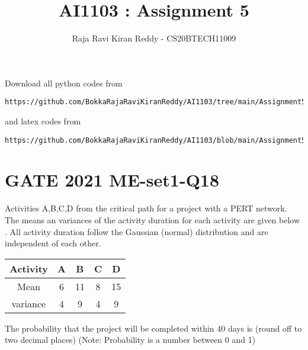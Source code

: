 \documentclass[journal,12pt,twocolumn]{IEEEtran}
\begin{document}
\let\vec\mathbf
\renewcommand{\thefigure}{\theproblem}
\def\putbox#1#2#3{\makebox[0in][l]{\makebox[#1][l]{}\raisebox{\baselineskip}[0in][0in]{\raisebox{#2}[0in][0in]{#3}}}}
     \def\rightbox#1{\makebox[0in][r]{#1}}
     \def\centbox#1{\makebox[0in]{#1}}
     \def\topbox#1{\raisebox{-\baselineskip}[0in][0in]{#1}}
     \def\midbox#1{\raisebox{-0.5\baselineskip}[0in][0in]{#1}}
\vspace{3cm}
\title{AI1103 : Assignment 5}
\author{Raja Ravi Kiran Reddy - CS20BTECH11009}
\maketitle
\newpage
\bigskip
\renewcommand{\thefigure}{\arabic{figure}}
\renewcommand{\thetable}{\arabic{table}}
Download all python codes from 
\begin{lstlisting}
https://github.com/BokkaRajaRaviKiranReddy/AI1103/tree/main/Assignment5/codes
\end{lstlisting}
%
and latex codes from 
%
\begin{lstlisting}
https://github.com/BokkaRajaRaviKiranReddy/AI1103/blob/main/Assignment5/Assignment5.tex
\end{lstlisting}
\section{GATE 2021 ME-set1-Q18}
Activities A,B,C,D from the critical path for a project with a PERT network. The means an variances of the activity duration for each activity are given below . All activity duration follow the Gaussian (normal) distribution and are independent of each other.
\begin{table}[h!]
\centering
\begin{tabular}{|c||c|c|c|c|}
    \hline
    Activity & A& B& C& D \\
    \hline
    Mean & 6& 11& 8& 15\\[1ex]
    \hline
    variance & 4& 9& 4& 9\\[1ex]
    \hline
\end{tabular}
\end{table}
The probability that the project will be completed within 40 days is  
(round off to two decimal places)
(Note: Probability is a number between 0 and 1)
\end{document}
